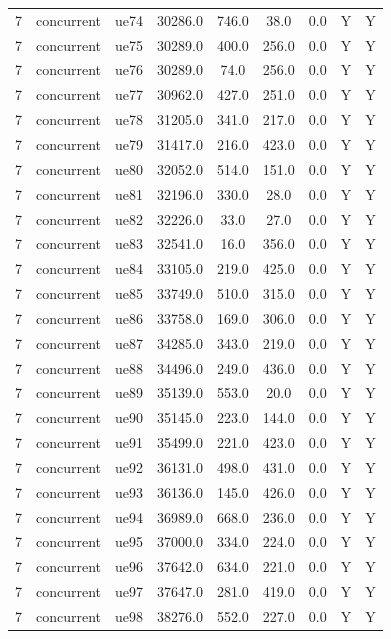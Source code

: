 \begin{table}[ht]
\begin{tabular}{|c|c|c|c|c|c|c|c|c|}
7 & concurrent & ue74 & 30286.0 & 746.0 & 38.0 & 0.0 & Y & Y \\
7 & concurrent & ue75 & 30289.0 & 400.0 & 256.0 & 0.0 & Y & Y \\
7 & concurrent & ue76 & 30289.0 & 74.0 & 256.0 & 0.0 & Y & Y \\
7 & concurrent & ue77 & 30962.0 & 427.0 & 251.0 & 0.0 & Y & Y \\
7 & concurrent & ue78 & 31205.0 & 341.0 & 217.0 & 0.0 & Y & Y \\
7 & concurrent & ue79 & 31417.0 & 216.0 & 423.0 & 0.0 & Y & Y \\
7 & concurrent & ue80 & 32052.0 & 514.0 & 151.0 & 0.0 & Y & Y \\
7 & concurrent & ue81 & 32196.0 & 330.0 & 28.0 & 0.0 & Y & Y \\
7 & concurrent & ue82 & 32226.0 & 33.0 & 27.0 & 0.0 & Y & Y \\
7 & concurrent & ue83 & 32541.0 & 16.0 & 356.0 & 0.0 & Y & Y \\
7 & concurrent & ue84 & 33105.0 & 219.0 & 425.0 & 0.0 & Y & Y \\
7 & concurrent & ue85 & 33749.0 & 510.0 & 315.0 & 0.0 & Y & Y \\
7 & concurrent & ue86 & 33758.0 & 169.0 & 306.0 & 0.0 & Y & Y \\
7 & concurrent & ue87 & 34285.0 & 343.0 & 219.0 & 0.0 & Y & Y \\
7 & concurrent & ue88 & 34496.0 & 249.0 & 436.0 & 0.0 & Y & Y \\
7 & concurrent & ue89 & 35139.0 & 553.0 & 20.0 & 0.0 & Y & Y \\
7 & concurrent & ue90 & 35145.0 & 223.0 & 144.0 & 0.0 & Y & Y \\
7 & concurrent & ue91 & 35499.0 & 221.0 & 423.0 & 0.0 & Y & Y \\
7 & concurrent & ue92 & 36131.0 & 498.0 & 431.0 & 0.0 & Y & Y \\
7 & concurrent & ue93 & 36136.0 & 145.0 & 426.0 & 0.0 & Y & Y \\
7 & concurrent & ue94 & 36989.0 & 668.0 & 236.0 & 0.0 & Y & Y \\
7 & concurrent & ue95 & 37000.0 & 334.0 & 224.0 & 0.0 & Y & Y \\
7 & concurrent & ue96 & 37642.0 & 634.0 & 221.0 & 0.0 & Y & Y \\
7 & concurrent & ue97 & 37647.0 & 281.0 & 419.0 & 0.0 & Y & Y \\
7 & concurrent & ue98 & 38276.0 & 552.0 & 227.0 & 0.0 & Y & Y \\

\end{tabular}
\end{table}
